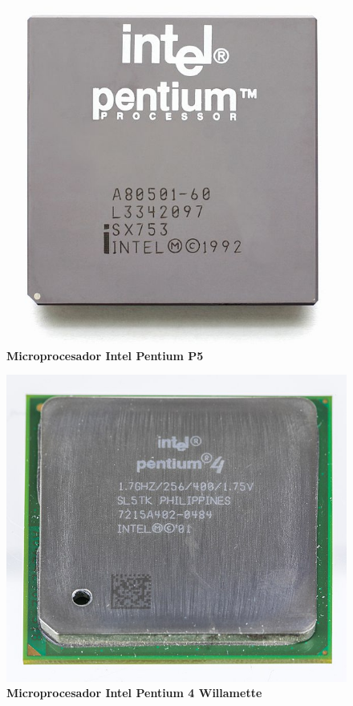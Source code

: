 \begin{figure}[htb]
	\centering
	\includegraphics[scale = 0.15]{Graphics/Intel_Pentium_P5.jpg}
	\caption{\textbf{Microprocesador Intel Pentium P5}}
	\label{fig:22}
\end{figure}

\begin{figure}[htb]
	\centering
	\includegraphics[scale = 0.15]{Graphics/Pentium_4_-_SL5TK-3056.jpg}
	\caption{\textbf{Microprocesador Intel Pentium 4 Willamette}}
	\label{fig:23}
\end{figure}

